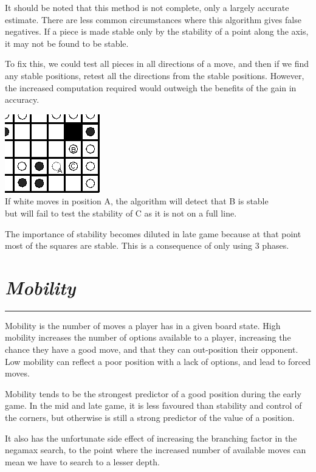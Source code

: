 \documentclass[10pt]{report}
\begin{document}
\begin{multicols}{2}
It should be noted that this method is not complete, only a largely accurate estimate. There are less common circumstances where this algorithm gives false negatives. If a piece is made stable only by the stability of a point along the axis, it may not be found to be stable.

To fix this, we could test all pieces in all directions of a move, and then if we find any stable positions, retest all the directions from the stable positions. However, the increased computation required would outweigh the benefits of the gain in accuracy.

\begin{center}
\includegraphics[scale=0.6]{falsepos.PNG}\\
If white moves in position A, the algorithm will detect that B is stable\\ but will fail to test the stability of C as it is not on a full line.
\end{center}

The importance of stability becomes diluted in late game because at that point most of the squares are stable. This is a consequence of only using 3 phases.
\section*{\emph{\textmd{Mobility}}}
\hrule

Mobility is the number of moves a player has in a given board state. High mobility increases the number of options available to a player, increasing the chance they have a good move, and that they can out-position their opponent. Low mobility can reflect a poor position with a lack of options, and lead to forced moves.

Mobility tends to be the strongest predictor of a good position during the early game. In the mid and late game, it is less favoured than stability and control of the corners, but otherwise is still a strong predictor of the value of a position.

It also has the unfortunate side effect of increasing the branching factor in the negamax search, to the point where the increased number of available moves can mean we have to search to a lesser depth.

\end{multicols}
\end{document}
